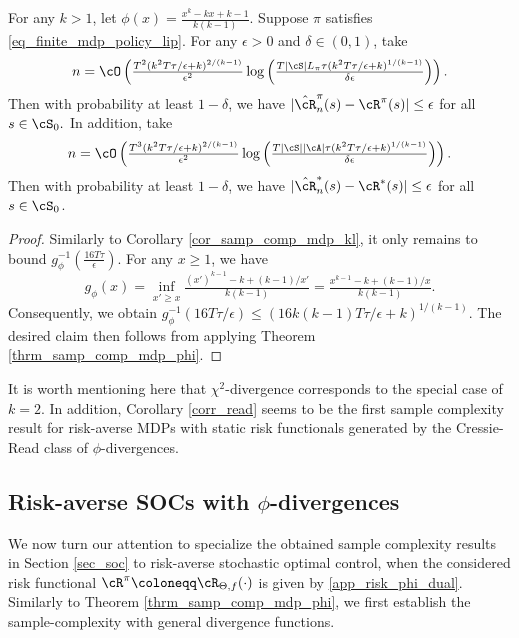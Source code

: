 \documentclass[9pt]{article}
\numberwithin{equation}{section}
\renewcommand{\frac}[2]{\tfrac{#1}{#2}}
\begin{document}
\begin{corollary}\label{corr_read}
    \label{cor_samp_comp_mdp_cr}
    For any $k > 1$, let $\phi(x) = \tfrac{x^k -kx + k-1}{k(k-1)}$. 
    Suppose $\pi$ satisfies \eqref{eq_finite_mdp_policy_lip}. For any $\epsilon > 0$ and $\delta \in (0,1)$, take
    \begin{align*}
    n = \cO \left(\tfrac{T^2 (k^2T \tau/\epsilon + k)^{2/(k-1)}}{\epsilon^2} \log \left(\tfrac{T |\cS| L_\pi \tau (k^2T \tau/\epsilon + k)^{1/(k-1)}}{\delta \epsilon} \right)\right). 
    \end{align*}
 Then with probability at least $1-\delta$, we have $|\hat{\cR}_n^\pi(s) - \cR^{\pi}(s)| \leq \epsilon$ for all $s \in \cS_0.$
    In addition, take
    \begin{align*}
    n = \cO \left(\tfrac{T^3 (k^2T \tau/\epsilon + k)^{2/(k-1)}}{\epsilon^2} \log \left(\tfrac{T |\cS| |\cA| \tau (k^2T \tau/\epsilon + k)^{1/(k-1)}}{\delta \epsilon} \right)\right).
    \end{align*}
    Then with probability at least $1-\delta$, we have  $| \hat{\cR}^*_n(s)  -\cR^*(s) | \leq \epsilon $ for all $ s \in \cS_0$.
\end{corollary}
\begin{proof}
    Similarly to Corollary \ref{cor_samp_comp_mdp_kl}, it only remains to bound $g_\phi^{-1}(\frac{16T \tau}{\epsilon})$. For any $x \geq 1$, we have
    $$g_\phi(x) = \inf_{x' \geq x} \tfrac{(x')^{k-1} -k + (k-1)/x'}{k(k-1)} = \tfrac{x^{k-1} -k + (k-1)/x}{k(k-1)}.$$
    Consequently, we obtain $g_\phi^{-1}(16T\tau/\epsilon) \leq (16k(k-1)T \tau/\epsilon + k)^{1/(k-1)}.$
    The desired claim then follows from applying Theorem \ref{thrm_samp_comp_mdp_phi}.
\end{proof}

It is worth mentioning here that $\chi^2$-divergence corresponds to the special case of $k = 2$.
In addition, Corollary \ref{corr_read} seems to be the first sample complexity result for risk-averse MDPs with static risk functionals generated by the Cressie-Read class of $\phi$-divergences. 



\subsection{Risk-averse SOCs with $\phi$-divergences}

We now turn our attention to specialize the obtained sample complexity results in Section \ref{sec_soc} to risk-averse stochastic optimal control, when the considered risk functional $\cR^\pi \coloneqq \cR_{\Theta, f}(\cdot)$ is given by \eqref{app_risk_phi_dual}.
Similarly to Theorem \ref{thrm_samp_comp_mdp_phi}, we first establish the sample-complexity with general divergence functions. 
\end{document}
